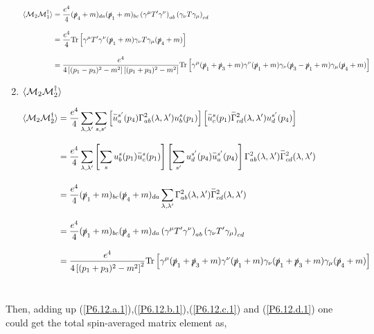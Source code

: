 \begin{solution}
\begin{enumerate}[label=(\alph*)]
    \begin{align}
        \langle \mathcal{M}_2\mathcal{M}_1^\dagger \rangle &=  \frac{e^4}{4}  (\slashed{p}_4+m)_{da}  (\slashed{p}_1+m)_{bc} \left( \gamma^\mu T' \gamma^\nu \right)_{ab}  \left( \gamma_\nu T \gamma_\mu \right)_{cd} \nonumber \\[0.12in]
        &=  \frac{e^4}{4} \text{Tr}\left[    \gamma^\mu T' \gamma^\nu   (\slashed{p}_1+m)   \gamma_\nu T \gamma_\mu   (\slashed{p}_4+m)  \right] \nonumber \\[0.12in]
        &=  \frac{e^4}{4\left[(p_1-p_3)^2-m^2\right]\left[(p_1+p_3)^2-m^2\right]} \text{Tr}\left[    \gamma^\mu  (\slashed{p}_1+\slashed{p}_3+m)  \gamma^\nu   (\slashed{p}_1+m)   \gamma_\nu (\slashed{p}_3-\slashed{p}_1+m) \gamma_\mu   (\slashed{p}_4+m)  \right]  \label{P6.12.c.1}
    \end{align}

    \item $\langle \mathcal{M}_2\mathcal{M}_2^\dagger \rangle $
    
    \begin{align}
        \expval{\mathcal{M}_2\mathcal{M}_2^\dagger} &= \frac{e^4}{4}  \sum_{\lambda,\lambda'} \sum_{s,s'} \left[  \overbar{u}^{s'}_a(p_4) \Gamma^2_{ab}(\lambda,\lambda')u^{s}_b(p_1)\right] \left[  \overbar{u}^{s}_c(p_1)\overbar{\Gamma}^2_{cd}(\lambda,\lambda')u^{s'}_d(p_4)\right] \nonumber \\[0.12in]
        &=  \frac{e^4}{4} \sum_{\lambda,\lambda'} \left[ \sum_{s} u^s_b(p_1) \overbar{u}^s_c(p_1) \right]  \left[ \sum_{s'} u^{s'}_d(p_4)   \overbar{u}^{s'}_a(p_4) \right] \Gamma^2_{ab}(\lambda,\lambda') \overbar{\Gamma}^2_{cd}(\lambda,\lambda') \nonumber \\[0.15in]
        &= \frac{e^4}{4}  (\pslash_1+m)_{bc}  (\pslash_4+m)_{da}  \sum_{\lambda,\lambda'} \Gamma^2_{ab}(\lambda,\lambda') \overbar{\Gamma}^2_{cd}(\lambda,\lambda') \nonumber \\[0.12in]
        &= \frac{e^4}{4}  (\pslash_1+m)_{bc}  (\pslash_4+m)_{da} \left( \gamma^\mu T' \gamma^\nu \right)_{ab} \left( \gamma_\nu T' \gamma_\mu \right)_{cd} \nonumber \\[0.12in]
        &= \frac{e^4}{4\left[(p_1+p_3)^2-m^2\right]^2} \tr \left[ \gamma^\mu (\pslash_1+\pslash_3 +m) \gamma^\nu (\pslash_1 + m ) \gamma_\nu  (\pslash_1+\pslash_3 +m) \gamma_\mu (\pslash_4 + m ) \right] \label{P6.12.d.1}
    \end{align}\\
\end{enumerate}

Then, adding up (\ref{P6.12.a.1}),(\ref{P6.12.b.1}),(\ref{P6.12.c.1}) and (\ref{P6.12.d.1}) one could get the total spin-averaged matrix element as, 


\end{solution}
